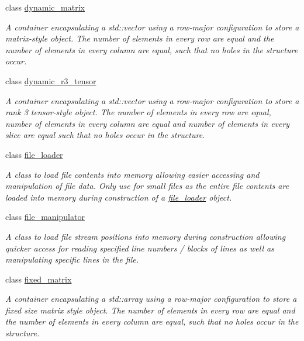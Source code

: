 \begin{DoxyCompactItemize}
\item 
class \hyperlink{classcrsc_1_1dynamic__matrix}{dynamic\+\_\+matrix}
\begin{DoxyCompactList}\small\item\em A container encapsulating a {\ttfamily std\+::vector} using a row-\/major configuration to store a matrix-\/style object. The number of elements in every row are equal and the number of elements in every column are equal, such that no holes in the structure occur. \end{DoxyCompactList}\item 
class \hyperlink{classcrsc_1_1dynamic__r3__tensor}{dynamic\+\_\+r3\+\_\+tensor}
\begin{DoxyCompactList}\small\item\em A container encapsulating a {\ttfamily std\+::vector} using a row-\/major configuration to store a rank 3 tensor-\/style object. The number of elements in every row are equal, number of elements in every column are equal and number of elements in every slice are equal such that no holes occur in the structure. \end{DoxyCompactList}\item 
class \hyperlink{classcrsc_1_1file__loader}{file\+\_\+loader}
\begin{DoxyCompactList}\small\item\em A class to load file contents into memory allowing easier accessing and manipulation of file data. Only use for small files as the entire file contents are loaded into memory during construction of a \hyperlink{classcrsc_1_1file__loader}{file\+\_\+loader} object. \end{DoxyCompactList}\item 
class \hyperlink{classcrsc_1_1file__manipulator}{file\+\_\+manipulator}
\begin{DoxyCompactList}\small\item\em A class to load file stream positions into memory during construction allowing quicker access for reading specified line numbers / blocks of lines as well as manipulating specific lines in the file. \end{DoxyCompactList}\item 
class \hyperlink{classcrsc_1_1fixed__matrix}{fixed\+\_\+matrix}
\begin{DoxyCompactList}\small\item\em A container encapsulating a {\ttfamily std\+::array} using a row-\/major configuration to store a fixed size matrix style object. The number of elements in every row are equal and the number of elements in every column are equal, such that no holes occur in the structure. \end{DoxyCompactList}\item 

\end{DoxyCompactItemize}
